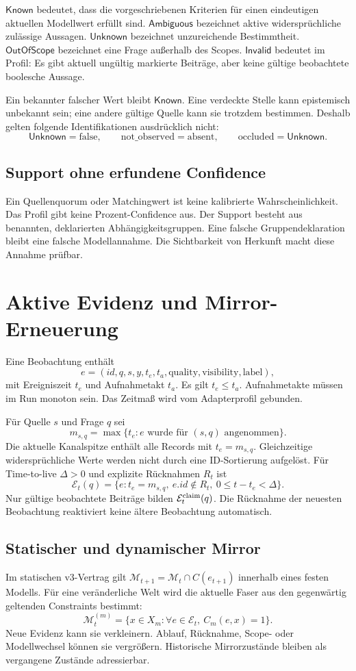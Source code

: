\documentclass[11pt,a4paper]{article}
\newcommand{\Known}{\ensuremath{\mathsf{Known}}}
\newcommand{\Unknown}{\ensuremath{\mathsf{Unknown}}}
\newcommand{\Ambiguous}{\ensuremath{\mathsf{Ambiguous}}}
\newcommand{\Invalid}{\ensuremath{\mathsf{Invalid}}}
\newcommand{\OOS}{\ensuremath{\mathsf{OutOfScope}}}
\newcommand{\M}{\mathcal M}
\newcommand{\E}{\mathcal E}
\newcommand{\nextsection}[2]{\clearpage{\color{accent}\small\textsf{#1}}\section{#2}}
\begin{document}
\Known{} bedeutet, dass die vorgeschriebenen Kriterien für einen
eindeutigen aktuellen Modellwert erfüllt sind. \Ambiguous{} bezeichnet
aktive widersprüchliche zulässige Aussagen. \Unknown{} bezeichnet
unzureichende Bestimmtheit. \OOS{} bezeichnet eine Frage außerhalb
des Scopes. \Invalid{} bedeutet im Profil: Es gibt aktuell ungültig
markierte Beiträge, aber keine gültige beobachtete boolesche Aussage.

Ein bekannter falscher Wert bleibt \Known. Eine verdeckte Stelle kann
epistemisch unbekannt sein; eine andere gültige Quelle kann sie trotzdem
bestimmen. Deshalb gelten folgende Identifikationen ausdrücklich nicht:
\[
\Unknown=\mathrm{false},\qquad
\mathrm{not\_observed}=\mathrm{absent},\qquad
\mathrm{occluded}=\Unknown.
\]

\subsection{Support ohne erfundene Confidence}
Ein Quellenquorum oder Matchingwert ist keine kalibrierte
Wahrscheinlichkeit. Das Profil gibt keine Prozent-Confidence aus.
Der Support besteht aus benannten, deklarierten Abhängigkeitsgruppen.
Eine falsche Gruppendeklaration bleibt eine falsche Modellannahme.
Die Sichtbarkeit von Herkunft macht diese Annahme prüfbar.

\nextsection{04 / ZEITVERTRAG}{Aktive Evidenz und Mirror-Erneuerung}
Eine Beobachtung enthält
\[
e=(id,q,s,y,t_e,t_a,\mathrm{quality},\mathrm{visibility},\mathrm{label}),
\]
mit Ereigniszeit $t_e$ und Aufnahmetakt $t_a$. Es gilt $t_e\leq t_a$.
Aufnahmetakte müssen im Run monoton sein. Das Zeitmaß wird vom
Adapterprofil gebunden.

Für Quelle $s$ und Frage $q$ sei
\[
m_{s,q}=\max\{t_e:e\text{ wurde für }(s,q)\text{ angenommen}\}.
\]
Die aktuelle Kanalspitze enthält alle Records mit $t_e=m_{s,q}$.
Gleichzeitige widersprüchliche Werte werden nicht durch eine
ID-Sortierung aufgelöst. Für Time-to-live $\Delta>0$ und explizite
Rücknahmen $R_t$ ist
\[
\E_t(q)=\{e:t_e=m_{s,q},\ e.id\notin R_t,\ 0\leq t-t_e<\Delta\}.
\]
Nur gültige beobachtete Beiträge bilden $\E_t^{\rm claim}(q)$.
Die Rücknahme der neuesten Beobachtung reaktiviert keine ältere
Beobachtung automatisch.

\subsection{Statischer und dynamischer Mirror}
Im statischen v3-Vertrag gilt
$\M_{t+1}=\M_t\cap C(e_{t+1})$ innerhalb eines festen Modells.
Für eine veränderliche Welt wird die aktuelle Faser aus den
gegenwärtig geltenden Constraints bestimmt:
\[
\M_t^{(m)}=\{x\in X_m:\forall e\in\E_t,\ C_m(e,x)=1\}.
\]
Neue Evidenz kann sie verkleinern. Ablauf, Rücknahme, Scope- oder
Modellwechsel können sie vergrößern. Historische Mirrorzustände
bleiben als vergangene Zustände adressierbar.
\end{document}
